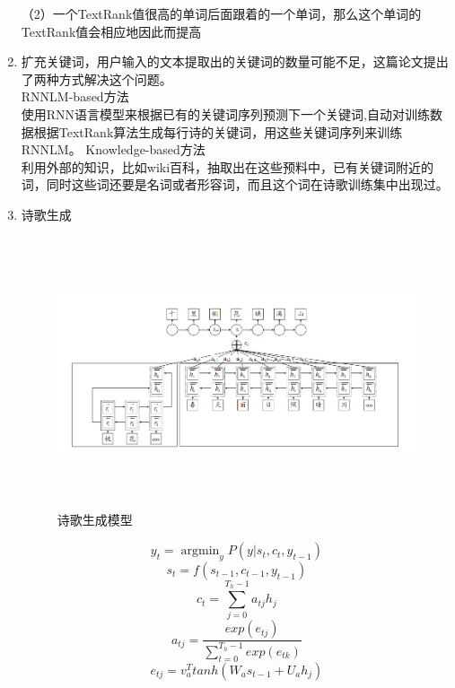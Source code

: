 \documentclass[a4paper,UTF8]{article}
\numberwithin{equation}{section}
\begin{document}
\begin{enumerate}
    （2）一个TextRank值很高的单词后面跟着的一个单词，那么这个单词的TextRank值会相应地因此而提高
    \newpage
    \item 扩充关键词，用户输入的文本提取出的关键词的数量可能不足，这篇论文提出了两种方式解决这个问题。\\
        \subitem{[1]} RNNLM-based方法\\
        使用RNN语言模型来根据已有的关键词序列预测下一个关键词,自动对训练数据根据TextRank算法生成每行诗的关键词，用这些关键词序列来训练RNNLM。
        \subitem{[2]} Knowledge-based方法\\
        利用外部的知识，比如wiki百科，抽取出在这些预料中，已有关键词附近的词，同时这些词还要是名词或者形容词，而且这个词在诗歌训练集中出现过。

    \item 诗歌生成\\
    \begin{figure}[H]
        \centering
        \includegraphics[height=8cm,width=16cm]{model.png}
        \caption{诗歌生成模型}
    \end{figure}
    $$ y_{t}=\mathop{\arg\min}_{y}P(y|s_t,c_t,y_{t-1})$$
    $$ s_t = f(s_{t-1},c_{t-1},y_{t-1})$$
    $$ c_t = \sum_{j=0}^{T_h-1}a_{tj}h_j$$
    $$ a_{tj} = \frac{exp(e_{tj})}{\sum_{t=0}^{T_h-1}exp(e_{tk})}$$
    $$ e_{tj} = v_a^T tanh(W_{a}s_{t-1}+U_{a}h_j)$$

\end{enumerate}

\newpage
\end{document}
